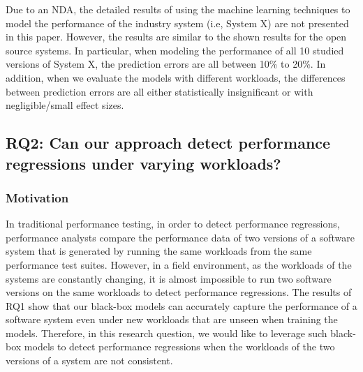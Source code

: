 

Due to an NDA, the detailed results of using the machine learning techniques to model the performance of the industry system (i.e, System X) are not presented in this paper. However, the results are similar to the shown results for the open source systems. In particular, when modeling the performance of all 10 studied versions of System X, the prediction errors are all between 10\% to 20\%. In addition, when we evaluate the models with different workloads, the differences between prediction errors are all either statistically insignificant or with negligible/small effect sizes.




\subsection*{RQ2: Can our approach detect performance regressions under varying workloads?}

\subsubsection*{Motivation}

In traditional performance testing, in order to detect performance regressions, performance analysts compare the performance data of two versions of a software system that is generated by running the same workloads from the same performance test suites. 
However, in a field environment, as the workloads of the systems are constantly changing, it is almost impossible to run two software versions on the same workloads to detect performance regressions.
The results of RQ1 show that our black-box models can accurately capture the performance of a software system even under new workloads that are unseen when training the models.
Therefore, in this research question, we would like to leverage such black-box models to detect performance regressions when the workloads of the two versions of a system are not consistent.

